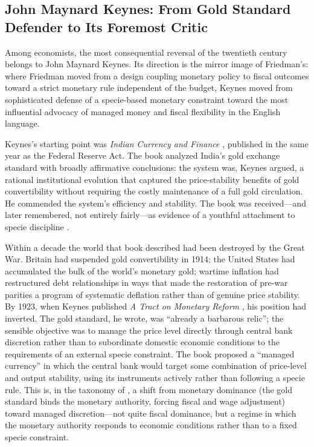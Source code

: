 \documentclass[12pt]{article}
\begin{document}
\subsection{John Maynard Keynes: From Gold Standard Defender to
             Its Foremost Critic}

Among economists, the most consequential reversal of the twentieth
century belongs to John Maynard Keynes.  Its direction is the mirror
image of Friedman's: where Friedman moved from a design coupling
monetary policy to fiscal outcomes toward a strict monetary rule
independent of the budget, Keynes moved from sophisticated defense of a
specie-based monetary constraint toward the most influential advocacy
of managed money and fiscal flexibility in the English language.

Keynes's starting point was \textit{Indian Currency and Finance}
\citep{Keynes1913}, published in the same year as the Federal Reserve
Act.  The book analyzed India's gold exchange standard with broadly
affirmative conclusions: the system was, Keynes argued, a rational
institutional evolution that captured the price-stability benefits of
gold convertibility without requiring the costly maintenance of a full
gold circulation.  He commended the system's efficiency and stability.
The book was received---and later remembered, not entirely fairly---as
evidence of a youthful attachment to specie discipline \citep{Moggridge1992}.

Within a decade the world that book described had been destroyed by the
Great War.  Britain had suspended gold convertibility in 1914; the United
States had accumulated the bulk of the world's monetary gold; wartime
inflation had restructured debt relationships in ways that made the
restoration of pre-war parities a program of systematic deflation rather
than of genuine price stability.  By 1923, when Keynes published
\textit{A Tract on Monetary Reform} \citep{Keynes1923}, his position
had inverted.  The gold standard, he wrote, was ``already a barbarous
relic''; the sensible objective was to manage the price level directly
through central bank discretion rather than to subordinate domestic
economic conditions to the requirements of an external specie constraint.
The book proposed a ``managed currency'' in which the central bank would
target some combination of price-level and output stability, using its
instruments actively rather than following a specie rule.  This is, in
the taxonomy of \citet{Sargent2011}, a shift from monetary dominance
(the gold standard binds the monetary authority, forcing fiscal and wage
adjustment) toward managed discretion---not quite fiscal dominance, but
a regime in which the monetary authority responds to economic conditions
rather than to a fixed specie constraint.
\end{document}
